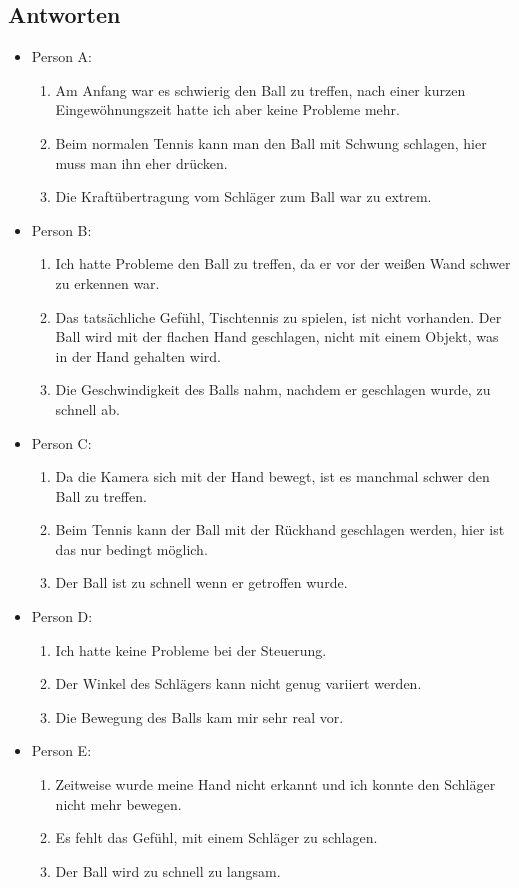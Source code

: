 \subsection{Antworten}
\begin{itemize}
	\item Person A: \begin{enumerate}
		\item \glqq Am Anfang war es schwierig den Ball zu treffen, nach einer kurzen Eingewöhnungszeit hatte ich aber keine Probleme mehr.\grqq
		\item \glqq Beim normalen Tennis kann man den Ball mit Schwung schlagen, hier muss man ihn eher drücken.\grqq
		\item \glqq Die Kraftübertragung vom Schläger zum Ball war zu extrem.\grqq
	\end{enumerate}
	\item Person B: \begin{enumerate}
		\item \glqq Ich hatte Probleme den Ball zu treffen, da er vor der weißen Wand schwer zu erkennen war.\grqq
		\item \glqq Das tatsächliche Gefühl, Tischtennis zu spielen, ist nicht vorhanden. Der Ball wird mit der flachen Hand geschlagen, nicht mit einem Objekt, was in der Hand gehalten wird.\grqq
		\item \glqq Die Geschwindigkeit des Balls nahm, nachdem er geschlagen wurde, zu schnell ab.\grqq
	\end{enumerate}
	\item	Person C: \begin{enumerate}
		\item \glqq Da die Kamera sich mit der Hand bewegt, ist es manchmal schwer den Ball zu treffen.\grqq
		\item \glqq Beim Tennis kann der Ball mit der Rückhand geschlagen werden, hier ist das nur bedingt möglich.\grqq
		\item \glqq Der Ball ist zu schnell wenn er getroffen wurde.\grqq
	\end{enumerate}
	\item	Person D: \begin{enumerate}
		\item \glqq Ich hatte keine Probleme bei der Steuerung.\grqq
		\item \glqq Der Winkel des Schlägers kann nicht genug variiert werden.\grqq
		\item \glqq Die Bewegung des Balls kam mir sehr real vor.\grqq
	\end{enumerate}
	\item Person E: \begin{enumerate}
		\item \glqq Zeitweise wurde meine Hand nicht erkannt und ich konnte den Schläger nicht mehr bewegen.\grqq
		\item \glqq Es fehlt das Gefühl, mit einem Schläger zu schlagen.\grqq
		\item \glqq Der Ball wird zu schnell zu langsam.\grqq
	\end{enumerate}
\end{itemize}
